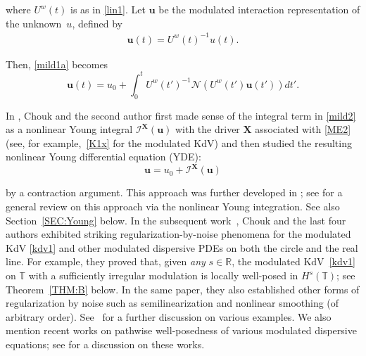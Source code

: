 \documentclass[letterpaper, 11pt,  reqno]{amsart}
\newcommand{\1}{\hspace{0.5mm}\textup{I}\hspace{0.5mm}}
\newcommand{\I}{\mathcal{I}}
\newcommand{\noi}{\noindent}
\newcommand{\T}{\mathbb{T}}
\newcommand{\NN}{\mathcal{N}}
\newcommand{\uw}{U^w}
\newcommand{\uu}{\mathbf{u}}
\newcommand{\XX}{\mathbf{X}}
\numberwithin{equation}{section}
\numberwithin{theorem}{section}
\begin{document}
\noi
where 
$\uw(t)$ is as in \eqref{lin1}.
Let $\uu$ be 
 the 
 modulated interaction representation
 of the unknown~$u$, defined by 
\begin{align}
\uu(t)=\uw(t)^{-1}u(t).
\label{int1} 
\end{align}

\noi
Then, \eqref{mild1a} becomes
\begin{equation}
\uu(t) = u_0 + \int_0 ^t \uw(t')^{-1}\NN(\uw(t') \uu(t'))dt'.
\label{mild2}
\end{equation}



\noi
In \cite{CG1},   %
Chouk and the second author 
first  made sense of the integral term in \eqref{mild2}
as a nonlinear Young integral
$\I^\XX(\uu)$ with  the driver $\XX$ associated with \eqref{ME2}
(see, for example,~\eqref{K1x}
for the modulated KdV)
and then studied the 
 resulting nonlinear Young differential equation (YDE):
\begin{equation}
\uu = u_0 + \I^\XX(\uu)
\label{YDE0a}
\end{equation}

\noi
by a contraction argument. 
This approach was further developed in \cite{CGLLO1};
see \cite[Section~3]{CGLLO1}
for a general review on this approach via the 
nonlinear Young integration. %
See also Section~\ref{SEC:Young} below.
In the subsequent work~\cite{CGLLO1}, 
Chouk and the last four authors 
exhibited striking regularization-by-noise phenomena
for the modulated 
KdV \eqref{kdv1} and other modulated dispersive PDEs
 on both the circle and the real line.
For example, 
they  proved that, given {\it any} $s \in \mathbb R$, the modulated KdV~\eqref{kdv1} on $\T$ with a sufficiently irregular modulation is locally well-posed in $H^s(\T)$;
see Theorem~\ref{THM:B} below.
In the same paper, %
they also established 
other forms of regularization by noise
such as 
semilinearization and nonlinear smoothing
(of arbitrary order).
See~\cite{CGLLO1}
for a further discussion on various examples.
We also mention 
recent works
\cite{Tanaka, Robert1, Robert2, Robert3, Robert4}
on pathwise well-posedness of  various modulated dispersive equations;
see \cite[Remark~1.14]{CGLLO1}
for a discussion on these works.








\medskip
\end{document}
